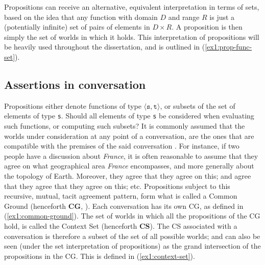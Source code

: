 Propositions can receive an alternative, equivalent interpretation in terms of sets, based on the idea that any function with domain $D$ and range $R$ is just a (potentially infinite) set of pairs of elements in $D\times R$. A proposition is then simply the set of worlds in which it holds. This interpretation of propositions will be heavily used throughout the dissertation, and is outlined in (\ref{ex1:prop-func-set}). 

\begin{exe}
	\label{ex1:prop-func-set}
\end{exe}

\subsection{Assertions in conversation}
Propositions either denote functions of type $\langle \texttt{s}, \texttt{t}\rangle$, or subsets of the set of elements of type \texttt{s}. Should all elements of type \texttt{s} be considered when evaluating such functions, or computing such subsets? It is commonly assumed that the worlds under consideration at any point of a conversation, are the ones that are compatible with the premises of the said conversation \citep{Stalnaker1974,Stalnaker1978}. For instance, if two people have a discussion about \textit{France}, it is often reasonable to assume that they agree on what geographical area \textit{France} encompasses, and more generally about the topology of Earth. Moreover, they agree that they agree on this; and agree that they agree that they agree on this; etc. Propositions subject to this recursive, mutual, tacit agreement pattern, form what is called a Common Ground (henceforth \textbf{CG}, \citep{Stalnaker1978}). Each conversation has its own CG, as defined in (\ref{ex1:common-ground}). The set of worlds in which all the propositions of the CG hold, is called the Context Set (henceforth \textbf{CS}). The CS associated with a conversation is therefore a subset of the set of all possible worlds; and can also be seen (under the set interpretation of propositions) as the grand intersection of the propositions in the CG. This is defined in (\ref{ex1:context-set}).

